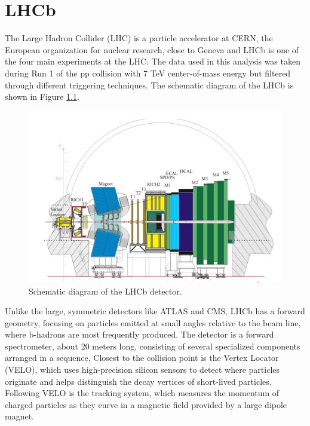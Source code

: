 \chapter{LHCb}
The Large Hadron Collider (LHC) is a particle accelerator at CERN, the European
organization for nuclear research, close to Geneva and LHCb is one of the four main experiments at the LHC. The data used in this analysis was taken during Run 1 of the pp collision with 7 TeV center-of-mass energy but filtered through different triggering techniques. The schematic diagram of the LHCb is shown in Figure \ref{LHCb}.\\

\begin{figure}[H]
    \centering
    \includegraphics[width=0.8\linewidth]{Figure/LHCb.jpg}
    \caption{Schematic diagram of the LHCb detector.}
    \label{LHCb}
\end{figure}

Unlike the large, symmetric detectors like ATLAS and CMS, LHCb has a forward geometry, focusing on particles emitted at small angles relative to the beam line, where b-hadrons are most frequently produced. The detector is a forward spectrometer, about 20 meters long, consisting of several specialized components arranged in a sequence. Closest to the collision point is the Vertex Locator (VELO), which uses high-precision silicon sensors to detect where particles originate and helps distinguish the decay vertices of short-lived particles. Following VELO is the tracking system, which measures the momentum of charged particles as they curve in a magnetic field provided by a large dipole magnet.\\

